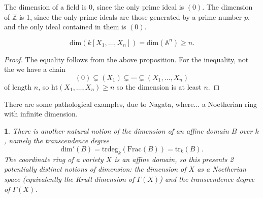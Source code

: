 \documentclass[12pt]{article}
\newtheorem{para}[theorem]{}
\begin{document}
\begin{example}
	The dimension of a field is 0, since the only prime ideal is $(0)$. The dimension of $\mathbb{Z}$ is 1, since the only prime ideals are those generated by a prime number $p$, and the only ideal contained in them is $(0)$.	
\end{example}

\begin{proposition}
	\begin{equation*}
		\text{dim}(k[X_1,\dots,X_n]) = \text{dim}(\mathbb{A}^n) \geq n.
	\end{equation*}
\end{proposition}
\begin{proof}
	The equality follows from the above proposition. For the inequality, not the we have a chain 
	\begin{equation*}
		(0) \subsetneq (X_1) \subsetneq \cdots \subsetneq (X_1,\dots, X_n)
	\end{equation*}
	of length $n$, so $\text{ht}(X_1,\dots,X_n)\geq n$ so the dimension is at least $n$.
\end{proof}

\begin{remark}
	There are some pathological examples, due to Nagata, where... a Noetherian ring with infinite dimension.
\end{remark}

\begin{para}
	There is another natural notion of the dimension of an affine domain $B$ over $k$, namely the transcendence degree 
	\begin{equation*}
		\text{dim}'(B) = \text{trdeg}_k(\text{Frac}(B)) = \text{tr}_k(B).
	\end{equation*}
	The coordinate ring of a variety $X$ is an affine domain, so this presents 2 potentially distinct notions of dimension: the dimension of $X$ as a Noetherian space (equivalently the Krull dimension of $\Gamma(X)$) and the transcendence degree of $\Gamma(X)$.
\end{para}
\end{document}
